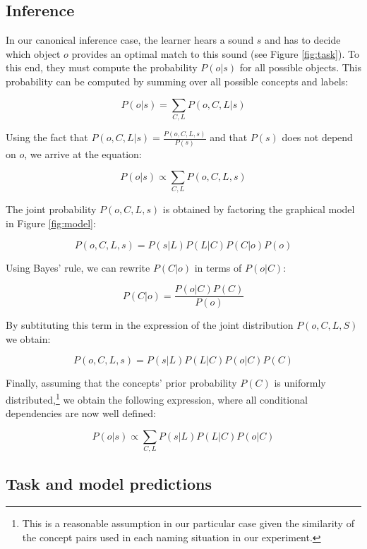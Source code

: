 \documentclass[english,,man,floatsintext]{apa6}
\let\rmarkdownfootnote\footnote%
\def\footnote{\protect\rmarkdownfootnote}
\theoremstyle{definition}
\theoremstyle{definition}
\theoremstyle{definition}
\theoremstyle{remark}
\begin{document}
\subsection{Inference}\label{inference}

In our canonical inference case, the learner hears a sound \(s\) and has
to decide which object \(o\) provides an optimal match to this sound
(see Figure \ref{fig:task}). To this end, they must compute the
probability \(P(o|s)\) for all possible objects. This probability can be
computed by summing over all possible concepts and labels:

\begin{equation}
P(o|s)=\sum_{C,L} P(o, C, L| s)  
\end{equation}

Using the fact that \(P(o,C,L|s) = \frac{P(o,C,L,s)}{P(s)}\) and that
\(P(s)\) does not depend on \(o\), we arrive at the equation:

\begin{equation}
P(o|s) \propto \sum_{C,L} P(o, C, L, s) 
\end{equation}

The joint probability \(P(o,C,L,s)\) is obtained by factoring the
graphical model in Figure \ref{fig:model}:

\[P(o,C,L,s) = P(s|L)P(L|C)P(C|o)P(o)\]

Using Bayes' rule, we can rewrite \(P(C|o)\) in terms of \(P(o|C)\):

\[P(C|o) = \frac{P(o|C)P(C)}{P(o)}\]

By subtituting this term in the expression of the joint distribution
\(P(o,C,L,S)\) we obtain:

\[P(o,C,L,s) = P(s|L)P(L|C)P(o|C)P(C)\]

Finally, assuming that the concepts' prior probability \(P(C)\) is
uniformly
distributed,\footnote{This is a reasonable assumption in our particular case given the similarity of the concept pairs used in each naming situation in our experiment.}
we obtain the following expression, where all conditional dependencies
are now well defined:

\begin{equation} \label{eq:general}
P(o|s) \propto \sum_{C,L}  P(s|L)P(L|C)P(o|C)
\end{equation}

\subsection{Task and model
predictions}\label{task-and-model-predictions}
\end{document}
